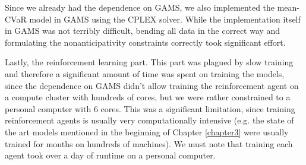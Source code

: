 Since we already had the dependence on GAMS, we also implemented the mean-CVaR model in GAMS using the CPLEX solver. While the implementation itself in GAMS was not terribly difficult, bending all data in the correct way and formulating the nonanticipativity constraints correctly took significant effort.

Lastly, the reinforcement learning part. This part was plagued by slow training and therefore a significant amount of time was spent on training the models, since the dependence on GAMS didn't allow training the reinforcement agent on a compute cluster with hundreds of cores, but we were rather constrained to a personal computer with 6 cores. This was a significant limitation, since training reinforcement agents is usually very computationally intensive (e.g. the state of the art models mentioned in the beginning of Chapter \ref{chapter3} were usually trained for months on hundreds of machines). We must note that training each agent took over a day of runtime on a personal computer.